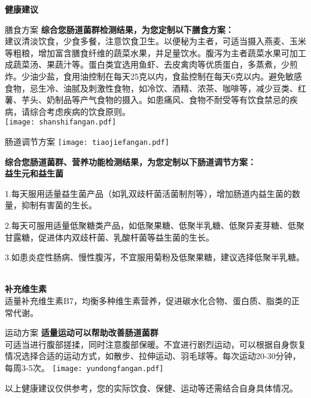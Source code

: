 

\usepackage{graphicx}
\graphicspath{{cores/}}



\vspace*{6mm}
\setlength{\arrayrulewidth}{1pt}
\fontsize{9.3pt}{11pt}\selectfont
\color{gray2}

\centerline{\bf\sanhao 健康建议}

\vspace*{2mm}

\begin{LRaside}[.20]{膳食方案}
{\bf *综合您肠道菌群检测结果，为您定制以下膳食方案：}\\
{\indent 建议清淡饮食，少食多餐，注意饮食卫生。以便秘为主者，可适当摄入燕麦、玉米等粗粮，增加富含膳食纤维的蔬菜水果，并足量饮水。腹泻为主者蔬菜水果可加工成蔬菜汤、果蔬汁等。蛋白类宜选用鱼虾、去皮禽肉等优质蛋白，多蒸煮，少煎炸。少油少盐，食用油控制在每天25克以内，食盐控制在每天6克以内。避免敏感食物，忌生冷、油腻及刺激性食物，如冷饮、酒精、浓茶、咖啡等，减少豆类、红薯、芋头、奶制品等产气食物的摄入。如患痛风、食物不耐受等有饮食禁忌的疾病，请综合考虑疾病的饮食原则。}\\
\asidebreak %
\noindent
\texttt{[image: shanshifangan.pdf]}

\end{LRaside}


\begin{LRaside}[.70]{肠道调节方案}
\noindent
\texttt{[image: tiaojiefangan.pdf]}

\asidebreak %
{\bf *综合您肠道菌群、营养功能检测结果，为您定制以下肠道调节方案：}\\
{\bf 益生元和益生菌}\\{\indent 1.每天服用适量益生菌产品（如乳双歧杆菌活菌制剂等），增加肠道内益生菌的数量，抑制有害菌的生长。

2.每天可服用适量低聚糖类产品，如低聚果糖、低聚半乳糖、低聚异麦芽糖、低聚甘露糖，促进体内双歧杆菌、乳酸杆菌等益生菌的生长。 

3.如患炎症性肠病、慢性腹泻，不宜服用菊粉及低聚果糖，建议选择低聚半乳糖。}\\
{\bf 补充维生素}\\{\indent 适量补充维生素B7，均衡多种维生素营养，促进碳水化合物、蛋白质、脂类的正常代谢。}\\
\end{LRaside}

\begin{LRaside}[.20]{运动方案}
{\bf *适量运动可以帮助改善肠道菌群}\\
{\indent 可适当进行腹部搓揉，同时注意腹部保暖。不宜进行剧烈运动，可以根据自身恢复情况选择合适的运动方式，如散步、拉伸运动、羽毛球等。每次运动20-30分钟，每周3-5次。}
\asidebreak %
\noindent
\texttt{[image: yundongfangan.pdf]}

\end{LRaside}

{\noindent\qihao *以上健康建议仅供参考，您的实际饮食、保健、运动等还需结合自身具体情况。}



